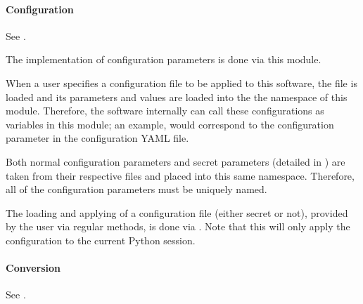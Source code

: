 \documentclass[letterpaper,11pt,english]{sphinxmanual}
\begin{document}
\paragraph{Configuration}
\label{\detokenize{technical/architecture/library:configuration}}
\sphinxAtStartPar
See {\hyperref[\detokenize{code/opihiexarata.library.config:module-opihiexarata.library.config}]{}}.

\sphinxAtStartPar
The implementation of configuration parameters is done via this module.

\sphinxAtStartPar
When a user specifies a configuration file to be applied to this software, the
file is loaded and its parameters and values are loaded into the the
namespace of this module. Therefore, the software internally can call these
configurations as variables in this module; an example,
 would correspond to the 
configuration parameter in the configuration YAML file.

\sphinxAtStartPar
Both normal configuration parameters and secret parameters (detailed in
{\hyperref[\detokenize{user/configuration:user-configuration}]{}}) are taken from their respective files and placed
into this same namespace. Therefore, all of the configuration parameters must
be uniquely named.

\sphinxAtStartPar
The loading and applying of a configuration file (either secret or not),
provided by the user via regular methods, is done via
{\hyperref[\detokenize{code/opihiexarata.library.config:opihiexarata.library.config.load_then_apply_configuration}]{}}. Note that
this will only apply the configuration to the current Python session.


\paragraph{Conversion}
\label{\detokenize{technical/architecture/library:conversion}}\label{\detokenize{technical/architecture/library:technical-architecture-library-conversion}}
\sphinxAtStartPar
See {\hyperref[\detokenize{code/opihiexarata.library.conversion:module-opihiexarata.library.conversion}]{}}.
\end{document}
